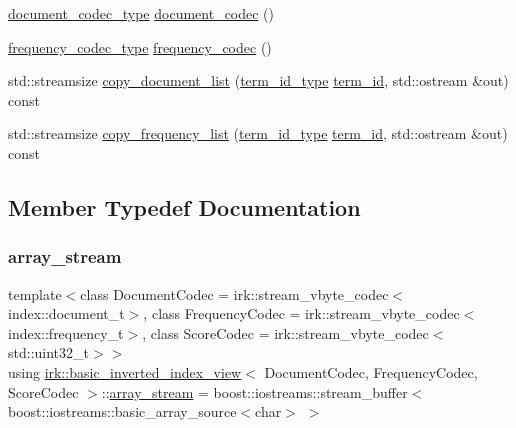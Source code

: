 \begin{DoxyCompactItemize}
\item 
\mbox{\hyperlink{classirk_1_1basic__inverted__index__view_a90415f73bd983f8a661d5502134d334f}{document\+\_\+codec\+\_\+type}} \mbox{\hyperlink{classirk_1_1basic__inverted__index__view_a52ba001bb12567d0c25f22519e194ce9}{document\+\_\+codec}} ()
\item 
\mbox{\hyperlink{classirk_1_1basic__inverted__index__view_a3d985daf7381825ddf7788611d03cb8f}{frequency\+\_\+codec\+\_\+type}} \mbox{\hyperlink{classirk_1_1basic__inverted__index__view_a7338edd10ee7eab058b840fa3e382faa}{frequency\+\_\+codec}} ()
\item 
std\+::streamsize \mbox{\hyperlink{classirk_1_1basic__inverted__index__view_a31a82a662afae22750e62bda04f8301f}{copy\+\_\+document\+\_\+list}} (\mbox{\hyperlink{classirk_1_1basic__inverted__index__view_a6b272abc76df208ce59bac93810e7331}{term\+\_\+id\+\_\+type}} \mbox{\hyperlink{classirk_1_1basic__inverted__index__view_aa7d7b49b3657d589020b4325162f55bf}{term\+\_\+id}}, std\+::ostream \&out) const
\item 
std\+::streamsize \mbox{\hyperlink{classirk_1_1basic__inverted__index__view_a7f5eae6697a96cc81e74e620b9447884}{copy\+\_\+frequency\+\_\+list}} (\mbox{\hyperlink{classirk_1_1basic__inverted__index__view_a6b272abc76df208ce59bac93810e7331}{term\+\_\+id\+\_\+type}} \mbox{\hyperlink{classirk_1_1basic__inverted__index__view_aa7d7b49b3657d589020b4325162f55bf}{term\+\_\+id}}, std\+::ostream \&out) const
\end{DoxyCompactItemize}


\subsection{Member Typedef Documentation}
\mbox{\label{classirk_1_1basic__inverted__index__view_ac50afe9fc376318d6a2034e3fa36a59f}} 
\subsubsection{\texorpdfstring{array\+\_\+stream}{array\_stream}}
{\footnotesize\ttfamily template$<$class Document\+Codec  = irk\+::stream\+\_\+vbyte\+\_\+codec$<$index\+::document\+\_\+t$>$, class Frequency\+Codec  = irk\+::stream\+\_\+vbyte\+\_\+codec$<$index\+::frequency\+\_\+t$>$, class Score\+Codec  = irk\+::stream\+\_\+vbyte\+\_\+codec$<$std\+::uint32\+\_\+t$>$$>$ \\
using \mbox{\hyperlink{classirk_1_1basic__inverted__index__view}{irk\+::basic\+\_\+inverted\+\_\+index\+\_\+view}}$<$ Document\+Codec, Frequency\+Codec, Score\+Codec $>$\+::\mbox{\hyperlink{classirk_1_1basic__inverted__index__view_ac50afe9fc376318d6a2034e3fa36a59f}{array\+\_\+stream}} =  boost\+::iostreams\+::stream\+\_\+buffer$<$ boost\+::iostreams\+::basic\+\_\+array\+\_\+source$<$char$>$ $>$}

